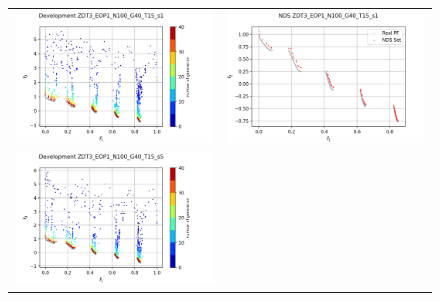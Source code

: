 \begin{figure}[H]
    \centering
    \begin{tabular}{c c}
    \includegraphics[scale=0.5]{figures/ZDT3_EOP1_N100_G40_T15/s1_dev.png} &
    \includegraphics[scale=0.5]{figures/ZDT3_EOP1_N100_G40_T15/s1_nds.png}\\
    \includegraphics[scale=0.5]{figures/ZDT3_EOP1_N100_G40_T15/s5_dev.png} &

\end{tabular}
\end{figure}
